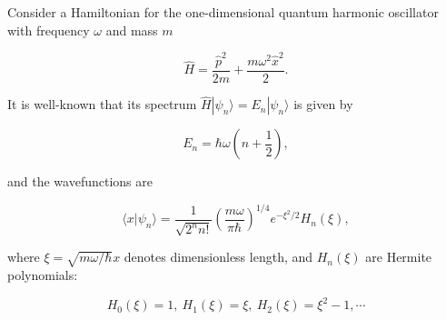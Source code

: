 
Consider a Hamiltonian for the one-dimensional quantum harmonic oscillator with frequency $\omega$ and mass $m$

\begin{equation}
    \hat{H} = \frac{\hat{p}^2}{2m} + \frac{m\omega^2\hat{x}^2}{2}.
\end{equation}

It is well-known that its spectrum $\hat{H}|\psi_n\rangle=E_n|\psi_n\rangle$ is given by

\begin{equation}
    E_n = \hbar\omega\left(n+\frac{1}{2}\right),
\end{equation}

and the wavefunctions are

\begin{equation}
    \langle x|\psi_n \rangle = \frac{1}{\sqrt{2^n n!}}\left(\frac{m\omega}{\pi\hbar}\right)^{1/4}e^{-\xi^2/2}H_n(\xi),
\end{equation}

where $\xi=\sqrt{m\omega/\hbar}x$ denotes dimensionless length, and $H_n(\xi)$ are Hermite polynomials:

\begin{equation}
    H_0(\xi) = 1,\ H_1(\xi) = \xi,\ H_2(\xi) = \xi^2-1,\cdots
\end{equation}
